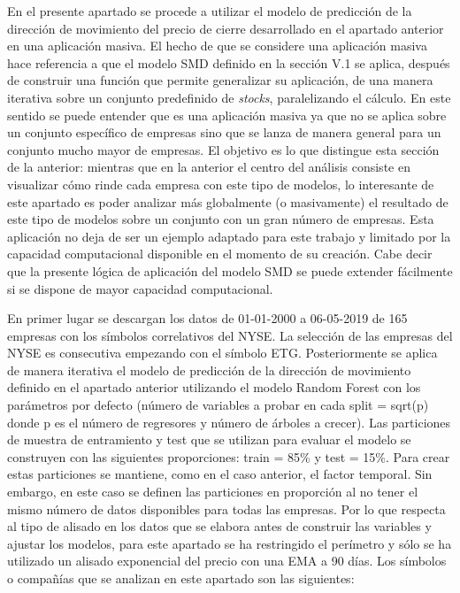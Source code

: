 \documentclass[]{DissertateUSU}
\begin{document}
\noindent En el presente apartado se procede a utilizar el modelo de
predicción de la dirección de movimiento del precio de cierre
desarrollado en el apartado anterior en una aplicación masiva. El hecho
de que se considere una aplicación masiva hace referencia a que el
modelo SMD definido en la sección V.1 se aplica, después de construir
una función que permite generalizar su aplicación, de una manera
iterativa sobre un conjunto predefinido de \emph{stocks}, paralelizando
el cálculo. En este sentido se puede entender que es una aplicación
masiva ya que no se aplica sobre un conjunto específico de empresas sino
que se lanza de manera general para un conjunto mucho mayor de empresas.
El objetivo es lo que distingue esta sección de la anterior: mientras
que en la anterior el centro del análisis consiste en visualizar cómo
rinde cada empresa con este tipo de modelos, lo interesante de este
apartado es poder analizar más globalmente (o masivamente) el resultado
de este tipo de modelos sobre un conjunto con un gran número de
empresas. Esta aplicación no deja de ser un ejemplo adaptado para este
trabajo y limitado por la capacidad computacional disponible en el
momento de su creación. Cabe decir que la presente lógica de aplicación
del modelo SMD se puede extender fácilmente si se dispone de mayor
capacidad computacional.

\noindent En primer lugar se descargan los datos de 01-01-2000 a
06-05-2019 de 165 empresas con los símbolos correlativos del NYSE. La
selección de las empresas del NYSE es consecutiva empezando con el
símbolo ETG. Posteriormente se aplica de manera iterativa el modelo de
predicción de la dirección de movimiento definido en el apartado
anterior utilizando el modelo Random Forest con los parámetros por
defecto (número de variables a probar en cada split = sqrt(p) donde p es
el número de regresores y número de árboles a crecer). Las particiones
de muestra de entramiento y test que se utilizan para evaluar el modelo
se construyen con las siguientes proporciones: train = 85\% y test =
15\%. Para crear estas particiones se mantiene, como en el caso
anterior, el factor temporal. Sin embargo, en este caso se definen las
particiones en proporción al no tener el mismo número de datos
disponibles para todas las empresas. Por lo que respecta al tipo de
alisado en los datos que se elabora antes de construir las variables y
ajustar los modelos, para este apartado se ha restringido el perímetro y
sólo se ha utilizado un alisado exponencial del precio con una EMA a 90
días. Los símbolos o compañías que se analizan en este apartado son las
siguientes:
\end{document}
